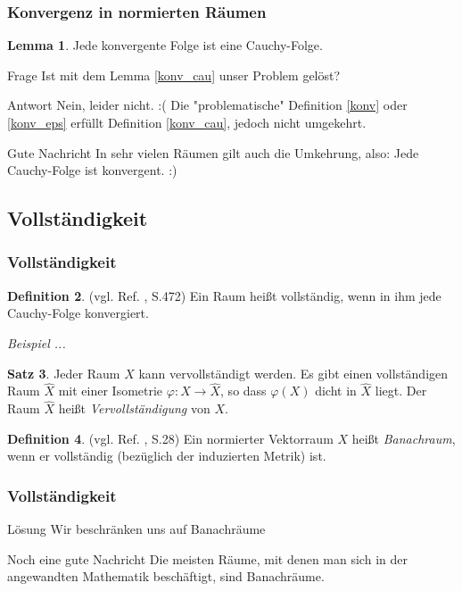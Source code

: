 \documentclass[t, handout]{beamer}
\theoremstyle{definition} %
\newtheorem{sa}{Satz}[section] %
\newtheorem{dfi}[sa]{Definition} %
\newtheorem{lem}[sa]{Lemma}
\begin{document}
\begin{frame}
\frametitle{Konvergenz in normierten Räumen}
\begin{lem}
Jede konvergente Folge ist eine Cauchy-Folge.
\end{lem}
\pause
\begin{block}{Frage}
Ist mit dem Lemma  \hyperref[konv_cau]{\ref*{konv_cau}} unser Problem gelöst?
\end{block}
\pause
\begin{block}{Antwort}
Nein, leider nicht. :( Die "problematische" Definition \hyperref[konv]{\ref*{konv}} oder \hyperref[konv_eps]{\ref*{konv_eps}} erfüllt Definition \hyperref[konv_cau]{\ref*{konv_cau}}, jedoch nicht umgekehrt.
\end{block}
\pause
\begin{block}{Gute Nachricht}
In sehr vielen Räumen gilt auch die Umkehrung, also: Jede Cauchy-Folge ist konvergent. :)
\end{block}
\end{frame}

\subsection{Vollständigkeit}

\begin{frame}
\frametitle{Vollständigkeit}
\begin{dfi}
(vgl. Ref. \cite{Werner}, S.472) Ein Raum heißt vollständig, wenn in ihm jede Cauchy-Folge konvergiert.
\end{dfi}
\pause
\textit{Beispiel ...}
\pause
\begin{sa}
Jeder Raum $X$ kann vervollständigt werden. Es gibt einen vollständigen Raum $\hat{X}$ mit einer Isometrie $\varphi : X \rightarrow \hat{X}$, so dass $\varphi(X)$ dicht in $\hat{X}$ liegt. Der Raum $\hat{X}$ heißt \textit{Vervollständigung} von $X$.
\end{sa}
\pause
\begin{dfi}
(vgl. Ref. \cite{Alt}, S.28) Ein normierter Vektorraum $X$ heißt \textit{Banachraum}, wenn er vollständig (bezüglich der induzierten Metrik) ist.
\end{dfi}
\end{frame}

\begin{frame}
\frametitle{Vollständigkeit}
\begin{block}{Lösung}
Wir beschränken uns auf Banachräume
\end{block}
\pause
\begin{block}{Noch eine gute Nachricht}
Die meisten Räume, mit denen man sich in der angewandten Mathematik beschäftigt, sind Banachräume.
\end{block}
\end{frame}
\end{document}
